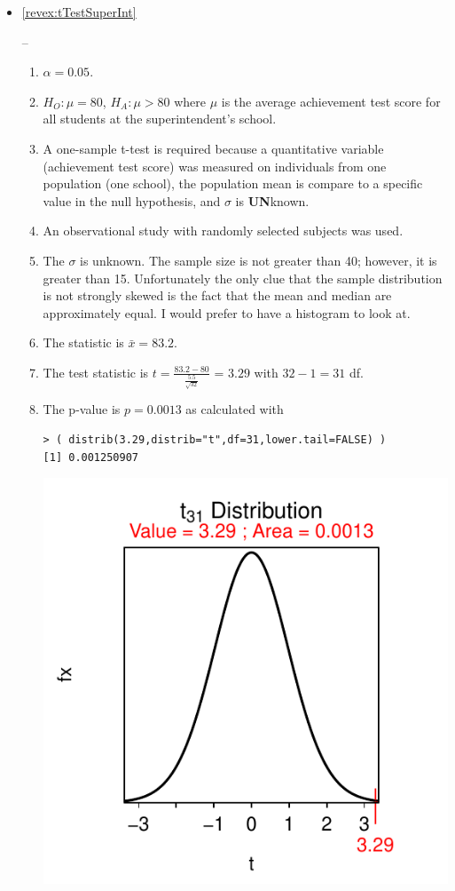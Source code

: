 \documentclass[10pt,openany]{book}\usepackage[]{graphicx}\usepackage[]{color}
\makeatletter
\newenvironment{kframe}{%
 \def\at@end@of@kframe{}%
 \ifinner\ifhmode%
  \def\at@end@of@kframe{\end{minipage}}%
  \begin{minipage}{\columnwidth}%
 \fi\fi%
 \def\FrameCommand##1{\hskip\@totalleftmargin \hskip-\fboxsep
 \colorbox{shadecolor}{##1}\hskip-\fboxsep
     \hskip-\linewidth \hskip-\@totalleftmargin \hskip\columnwidth}%
 \MakeFramed {\advance\hsize-\width
   \@totalleftmargin\z@ \linewidth\hsize
   \@setminipage}}%
 {\par\unskip\endMakeFramed%
 \at@end@of@kframe}
\newenvironment{knitrout}{}{} %
\makeatother
\begin{document}
\begin{itemize}
\begin{knitrout}
{}



\end{knitrout}

  \item \hypertarget{ans:tTestSuperInt}{\ref{revex:tTestSuperInt}} --
    \begin{enumerate}
      \item $\alpha=0.05$.
      \item $H_{O}:\mu=80$, $H_{A}:\mu>80$ where $\mu$ is the average achievement test score for all students at the superintendent's school.
      \item A one-sample t-test is required because a quantitative variable (achievement test score) was measured on individuals from one population (one school), the population mean is compare to a specific value in the null hypothesis, and $\sigma$ is \textbf{UN}known.
      \item An observational study with randomly selected subjects was used.
      \item The $\sigma$ is unknown.  The sample size is not greater than 40; however, it is greater than 15.  Unfortunately the only clue that the sample distribution is not strongly skewed is the fact that the mean and median are approximately equal.  I would prefer to have a histogram to look at.
      \item The statistic is $\bar{x}=83.2$.
      \item The test statistic is $t=\frac{83.2-80}{\frac{5.5}{\sqrt{32}}}$ = $3.29$ with $32-1=31$ df.
      \item The p-value is $p=0.0013$ as calculated with
\begin{knitrout}
\color{fgcolor}\begin{kframe}
\begin{verbatim}
> ( distrib(3.29,distrib="t",df=31,lower.tail=FALSE) )
[1] 0.001250907
\end{verbatim}
\end{kframe}

{\centering \includegraphics[width=.4\linewidth]{Figs/unnamed-chunk-360-1} 

}
\end{knitrout}
\end{enumerate}
\end{itemize}
\end{document}
